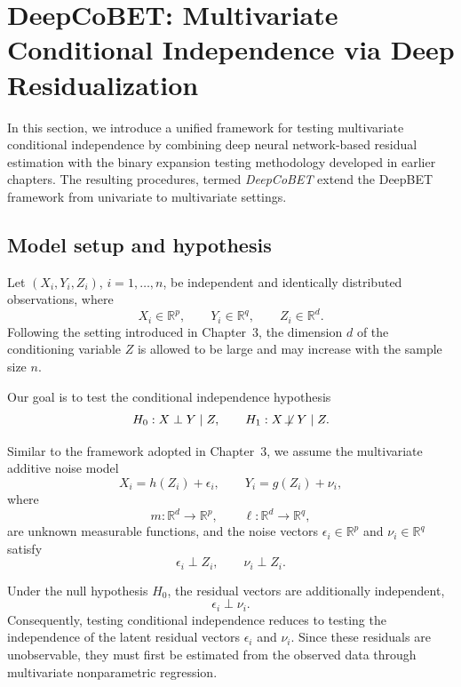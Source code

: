 \documentclass[12pt,reqno,oneside]{amsbook}
\theoremstyle{definition}
\theoremstyle{remark}
\begin{document}
\section{DeepCoBET: Multivariate Conditional Independence via Deep Residualization}
\label{sec:deepcobet}

In this section, we introduce a unified framework for testing multivariate
conditional independence by combining deep neural network-based residual
estimation with the binary expansion testing methodology developed in earlier
chapters. The resulting procedures, termed \emph{DeepCoBET} extend the DeepBET framework
from univariate to multivariate settings.

\subsection{Model setup and hypothesis}

Let $(X_i,Y_i,Z_i)$, $i=1,\ldots,n$, be independent and identically distributed observations, where %
\[
X_i\in\mathbb R^{p},
\qquad
Y_i\in\mathbb R^{q},
\qquad
Z_i\in\mathbb R^{d}.
\]
Following the setting introduced in Chapter~3, the dimension $d$ of the conditioning variable $Z$ is allowed to be large and may increase with the sample size $n$.

Our goal is to test the conditional independence hypothesis
\[
H_0:X\perp Y\mid Z,
\qquad
H_1:X\not\!\perp Y\mid Z.
\]

Similar to the framework adopted in Chapter~3,
we assume the multivariate additive noise model
\begin{equation}
X_i = h(Z_i)+\epsilon_i,
\qquad
Y_i = g(Z_i)+\nu_i,
\label{eq:anm_multi}
\end{equation}
where
\[
m:\mathbb R^{d}\to\mathbb R^{p},
\qquad
\ell:\mathbb R^{d}\to\mathbb R^{q},
\]
are unknown measurable functions, and the noise vectors
$\epsilon_i\in\mathbb R^{p}$ and
$\nu_i\in\mathbb R^{q}$ satisfy
\[
\epsilon_i\perp Z_i,
\qquad
\nu_i\perp Z_i.
\]

Under the null hypothesis $H_0$, the residual vectors are additionally independent,
\[
\epsilon_i\perp \nu_i.
\]
Consequently, testing conditional independence reduces to testing the independence of the latent residual vectors $\epsilon_i$ and $\nu_i$. Since these residuals are unobservable, they must first be estimated from the observed data through multivariate nonparametric regression.
\end{document}
